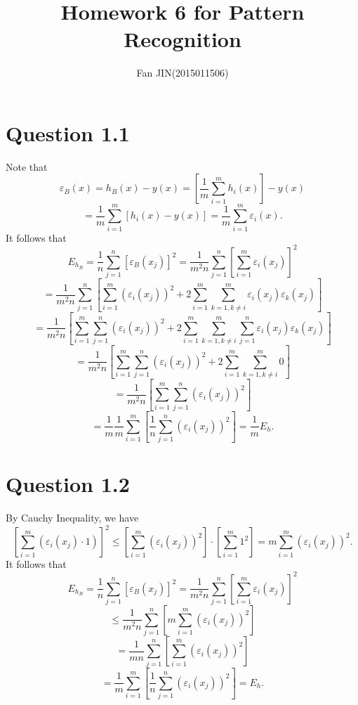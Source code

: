 \documentclass{article}
\begin{document}
\title{\textsf{Homework 6 for Pattern Recognition}}
\author{Fan JIN\quad (2015011506)}
\maketitle

\section*{Question 1.1}
{
    Note that 
    $$\varepsilon_B(x) = h_B(x) - y(x) = \left[ \frac{1}{m} \sum_{i=1}^{m} {h_i(x)} \right] - y(x)$$
    $$= \frac{1}{m} \sum_{i=1}^{m} {[h_i(x) - y(x)]} = \frac{1}{m} \sum_{i=1}^{m} {\varepsilon_i(x)}.$$
    It follows that 
    $$E_{h_B} = \frac{1}{n} \sum_{j=1}^{n}{[\varepsilon_B (x_j)]^2} = \frac{1}{m^2 n} \sum_{j=1}^{n}{ \left[ \sum_{i=1}^{m}{\varepsilon_i(x_j)} \right]^2 }$$
    $$= \frac{1}{m^2 n} \sum_{j=1}^{n}{ \left[ \sum_{i=1}^{m}{(\varepsilon_i(x_j))^2} + 2 \sum_{i=1}^{m}{ \sum_{k=1, k\neq i}^{m}{\varepsilon_i(x_j) \varepsilon_k(x_j)}} \right] }$$
    $$= \frac{1}{m^2 n} \left[ \sum_{i=1}^{m}\sum_{j=1}^{n}{(\varepsilon_i(x_j))^2} + 2 \sum_{i=1}^{m}{ \sum_{k=1, k\neq i}^{m} \sum_{j=1}^{n} {\varepsilon_i(x_j) \varepsilon_k(x_j)}} \right]$$
    $$= \frac{1}{m^2 n} \left[ \sum_{i=1}^{m}\sum_{j=1}^{n}{(\varepsilon_i(x_j))^2} + 2 \sum_{i=1}^{m}{ \sum_{k=1, k\neq i}^{m} 0 } \right]$$
    $$= \frac{1}{m^2 n} \left[ \sum_{i=1}^{m}\sum_{j=1}^{n}{(\varepsilon_i(x_j))^2} \right]$$
    $$= \frac{1}{m} \frac{1}{m} \sum_{i=1}^{m} \left[ \frac{1}{n}\sum_{j=1}^{n}{(\varepsilon_i(x_j))^2} \right] = \frac{1}{m} E_h.$$
}

\section*{Question 1.2}
{
    By Cauchy Inequality, we have
    $$\left[ \sum_{i=1}^{m}{(\varepsilon_i(x_j) \cdot 1)} \right]^2 \leq \left[ \sum_{i=1}^{m}{(\varepsilon_i(x_j))^2} \right] \cdot \left[ \sum_{i=1}^{m}{1^2} \right] = m \sum_{i=1}^{m}{(\varepsilon_i(x_j))^2}.$$
    It follows that 
    $$E_{h_B} = \frac{1}{n} \sum_{j=1}^{n}{[\varepsilon_B (x_j)]^2} = \frac{1}{m^2 n} \sum_{j=1}^{n}{ \left[ \sum_{i=1}^{m}{\varepsilon_i(x_j)} \right]^2 }$$
    $$\leq \frac{1}{m^2 n} \sum_{j=1}^{n}{ \left[ m \sum_{i=1}^{m}{(\varepsilon_i(x_j))^2} \right] }$$
    $$= \frac{1}{m n} \sum_{j=1}^{n}{ \left[ \sum_{i=1}^{m}{(\varepsilon_i(x_j))^2} \right] }$$
    $$= \frac{1}{m} \sum_{i=1}^{m} \left[ \frac{1}{n}\sum_{j=1}^{n}{(\varepsilon_i(x_j))^2} \right] = E_h.$$
}
\end{document}
